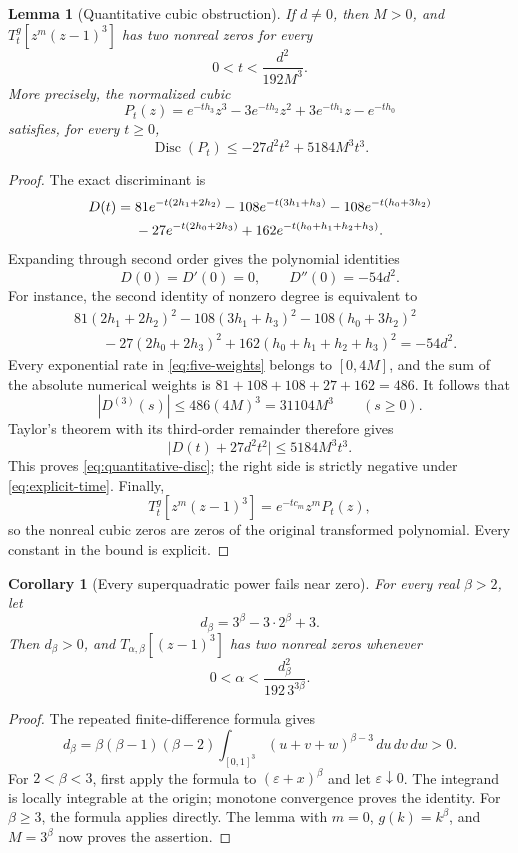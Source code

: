 \documentclass[11pt,a4paper]{article}
\newtheorem{lemma}[theorem]{Lemma}
\newtheorem{corollary}[theorem]{Corollary}
\theoremstyle{definition}
\theoremstyle{remark}
\DeclareMathOperator{\Disc}{Disc}
\begin{document}
\begin{lemma}[Quantitative cubic obstruction]
\label{lem:quantitative-cubic}
If $d\ne0$, then $M>0$, and
$T_t^g[z^m(z-1)^3]$ has two nonreal zeros for every
\begin{equation}\label{eq:explicit-time}
 0<t<\frac{d^2}{192M^3}.
\end{equation}
More precisely, the normalized cubic
\[
 P_t(z)=e^{-t h_3}z^3-3e^{-t h_2}z^2+3e^{-t h_1}z-e^{-t h_0}
\]
satisfies, for every $t\ge0$,
\begin{equation}\label{eq:quantitative-disc}
 \Disc(P_t)\le -27d^2t^2+5184M^3t^3.
\end{equation}
\end{lemma}

\begin{proof}
The exact discriminant is
\begin{align}
 D(t)={}&81e^{-t(2h_1+2h_2)}
 -108e^{-t(3h_1+h_3)}
 -108e^{-t(h_0+3h_2)}\notag\\
 &-27e^{-t(2h_0+2h_3)}
 +162e^{-t(h_0+h_1+h_2+h_3)}.\label{eq:five-weights}
\end{align}
Expanding through second order gives the polynomial identities
\[
 D(0)=D'(0)=0,\qquad D''(0)=-54d^2.
\]
For instance, the second identity of nonzero degree is equivalent to
\begin{align*}
 &81(2h_1+2h_2)^2-108(3h_1+h_3)^2-108(h_0+3h_2)^2\\
 &\qquad -27(2h_0+2h_3)^2
 +162(h_0+h_1+h_2+h_3)^2=-54d^2.
\end{align*}
Every exponential rate in \eqref{eq:five-weights} belongs to $[0,4M]$,
and the sum of the absolute numerical weights is
$81+108+108+27+162=486$.  It follows that
\[
 |D^{(3)}(s)|\le486(4M)^3=31104M^3\qquad(s\ge0).
\]
Taylor's theorem with its third-order remainder therefore gives
\[
 \bigl|D(t)+27d^2t^2\bigr|\le5184M^3t^3.
\]
This proves \eqref{eq:quantitative-disc}; the right side is strictly
negative under \eqref{eq:explicit-time}.  Finally,
\[
 T_t^g[z^m(z-1)^3]=e^{-t c_m}z^mP_t(z),
\]
so the nonreal cubic zeros are zeros of the original transformed
polynomial.  Every constant in the bound is explicit.
\end{proof}

\begin{corollary}[Every superquadratic power fails near zero]
\label{cor:superquadratic-power}
For every real $\beta>2$, let
\[
 d_\beta=3^\beta-3\cdot2^\beta+3.
\]
Then $d_\beta>0$, and $T_{\alpha,\beta}[(z-1)^3]$ has two nonreal
zeros whenever
\[
 0<\alpha<\frac{d_\beta^2}{192\,3^{3\beta}}.
\]
\end{corollary}
\begin{proof}
The repeated finite-difference formula gives
\[
 d_\beta=\beta(\beta-1)(\beta-2)
 \int_{[0,1]^3}(u+v+w)^{\beta-3}\,du\,dv\,dw>0.
\]
For $2<\beta<3$, first apply the formula to $(\varepsilon+x)^\beta$
and let $\varepsilon\downarrow0$.  The integrand is locally integrable
at the origin; monotone convergence proves the identity.  For
$\beta\ge3$, the formula applies directly.  The lemma with $m=0$,
$g(k)=k^\beta$, and $M=3^\beta$ now proves the assertion.
\end{proof}
\end{document}
